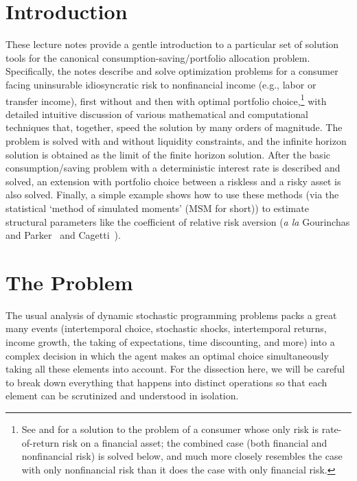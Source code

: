 \documentclass[titlepage, headings=optiontotocandhead]{Resources/texmf-local/tex/latex/econtex}
\begin{document}
\titlepagefinish

\thispagestyle{empty}
\ifpdf %
\tableofcontents {}\newpage
\fi
\newpage{}

\hypertarget{introduction}{}
\section{Introduction}\label{sec:introduction}

  These lecture notes provide a gentle introduction to a particular set of solution tools for the canonical consumption-saving/portfolio allocation problem.  Specifically, the notes describe and solve optimization problems for a consumer facing uninsurable idiosyncratic risk to nonfinancial income (e.g., labor or transfer income), first without and then with optimal portfolio choice,\footnote{See \cite{merton:restat} and \cite{samuelson:portfolio} for a solution to the problem of a consumer whose only risk is rate-of-return risk on a financial asset; the combined case (both financial and nonfinancial risk) is solved below, and much more closely resembles the case with only nonfinancial risk than it does the case with only financial risk.} with detailed intuitive discussion of various mathematical and computational techniques that, together, speed the solution by many orders of magnitude.  The problem is solved with and without liquidity constraints, and the infinite horizon solution is obtained as the limit of the finite horizon solution.  After the basic consumption/saving problem with a deterministic interest rate is described and solved, an extension with portfolio choice between a riskless and a risky asset is also solved.  Finally, a simple example shows how to use these methods (via the statistical `method of simulated moments' (MSM for short)) to estimate structural parameters like the coefficient of relative risk aversion (\textit{a la} Gourinchas and Parker~\citeyearpar{gpLifecycle} and Cagetti~\citeyearpar{cagettiWprofiles}).


\hypertarget{the-problem}{}
\section{The Problem}\label{sec:the-problem}

The usual analysis of dynamic stochastic programming problems packs a great many events (intertemporal choice, stochastic shocks, intertemporal returns, income growth, the taking of expectations, time discounting, and more) into a complex decision in which the agent makes an optimal choice simultaneously taking all these elements into account. For the dissection here, we will be careful to break down everything that happens into distinct operations so that each element can be scrutinized and understood in isolation.
\end{document}

